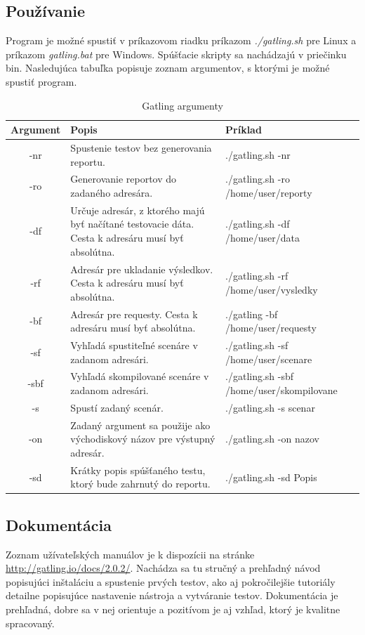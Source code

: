 \documentclass[12pt,oneside,final]{fithesis-utf8}
\begin{document}
\subsection{Používanie}
Program je možné spustiť v príkazovom riadku príkazom \textit{./gatling.sh} pre Linux a príkazom \textit{gatling.bat} pre Windows. Spúšťacie skripty sa nachádzajú v priečinku bin.  Nasledujúca tabuľka popisuje zoznam argumentov, s ktorými je možné spustiť program.
\newline
\newline
\begin{table}[h!]
\begin{center}
\begin{tabular}{| c | p{8cm} | p{5cm} |}
		\hline
		Argument & Popis & Príklad \\ \hline
		-nr & Spustenie testov bez generovania reportu. & ./gatling.sh -nr \\ \hline
		-ro & Generovanie reportov do zadaného adresára. & ./gatling.sh -ro /home/user/reporty \\ \hline
		-df & Určuje adresár, z ktorého majú byť načítané testovacie dáta. Cesta k adresáru musí byť absolútna. & ./gatling.sh -df /home/user/data \\ \hline
		-rf & Adresár pre ukladanie výsledkov. Cesta k adresáru musí byť absolútna. & ./gatling.sh -rf /home/user/vysledky \\ \hline
		-bf & Adresár pre requesty. Cesta k adresáru musí byť absolútna. & ./gatling -bf /home/user/requesty \\ \hline
		-sf & Vyhľadá spustiteľné scenáre v zadanom adresári. & ./gatling.sh -sf /home/user/scenare \\ \hline
		-sbf & Vyhľadá skompilované scenáre v zadanom adresári. & ./gatling.sh -sbf /home/user/skompilovane \\ \hline
		-s & Spustí zadaný scenár. & ./gatling.sh -s scenar \\ \hline
		-on & Zadaný argument sa použije ako východiskový názov pre výstupný adresár. & ./gatling.sh -on nazov \\ \hline
		-sd & Krátky popis spúšťaného testu, ktorý bude zahrnutý do reportu. & ./gatling.sh -sd Popis \\ \hline
	
\end{tabular}
\end{center}
\caption{Gatling argumenty}
\end{table}

\newpage
\subsection{Dokumentácia}
Zoznam užívateľských manuálov je k dispozícii na stránke \url{http://gatling.io/docs/2.0.2/}. Nachádza sa tu stručný a prehľadný návod popisujúci inštaláciu a spustenie prvých testov, ako aj pokročilejšie tutoriály detailne popisujúce nastavenie nástroja a vytváranie testov. Dokumentácia je prehľadná, dobre sa v nej orientuje a pozitívom je aj vzhľad, ktorý je kvalitne spracovaný.
\end{document}
